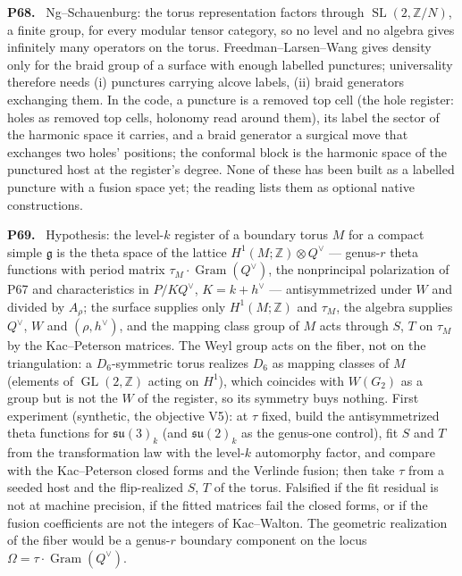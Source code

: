 \documentclass[11pt]{article}
\newcommand{\Z}{\mathbb{Z}}
\newcommand{\GL}{\operatorname{GL}}
\newcommand{\SL}{\operatorname{SL}}
\newenvironment{solution}[1]{\medskip\noindent\textbf{P#1.}\ }{\par\medskip}
\begin{document}
\begin{solution}{68}
Ng--Schauenburg: the torus representation factors through $\SL(2,\Z/N)$, a
finite group, for every modular tensor category, so no level and no algebra
gives infinitely many operators on the torus. Freedman--Larsen--Wang gives
density only for the braid group of a surface with enough labelled
punctures; universality therefore needs (i) punctures carrying alcove labels,
(ii) braid generators exchanging them. In the code, a puncture is a removed
top cell (the hole register: holes as removed top cells, holonomy read around
them), its label the sector of the harmonic space it carries, and a braid
generator a surgical move that exchanges two holes' positions; the
conformal block is the harmonic space of the punctured host at the register's
degree. None of these has been built as a labelled puncture with a fusion
space yet; the reading lists them as optional native constructions.
\end{solution}

\begin{solution}{69}
Hypothesis: the level-$k$ register of a boundary torus $M$ for a compact
simple $\mathfrak g$ is the theta space of the lattice $H^1(M;\Z)\otimes Q^\vee$
--- genus-$r$ theta functions with period matrix $\tau_M\cdot\operatorname{Gram}(Q^\vee)$,
the nonprincipal polarization of P67 and characteristics in
$P/KQ^\vee$, $K = k+h^\vee$ --- antisymmetrized
under $W$ and divided by $A_\rho$; the surface supplies only $H^1(M;\Z)$
and $\tau_M$, the algebra supplies $Q^\vee$, $W$ and $(\rho,h^\vee)$, and the
mapping class group of $M$ acts through $S$, $T$ on $\tau_M$ by the
Kac--Peterson matrices. The Weyl group acts on the fiber, not on the
triangulation: a $D_6$-symmetric torus realizes $D_6$ as mapping classes
of $M$ (elements of $\GL(2,\Z)$ acting on $H^1$), which coincides with
$W(G_2)$ as a group but is not the $W$ of the register, so its symmetry
buys nothing. First experiment (synthetic, the objective V5): at $\tau$ fixed,
build the antisymmetrized theta functions for $\mathfrak{su}(3)_k$ (and
$\mathfrak{su}(2)_k$ as the genus-one control), fit $S$ and $T$ from the
transformation law with the level-$k$ automorphy factor, and compare with
the Kac--Peterson closed forms and the Verlinde fusion; then take $\tau$ from
a seeded host and the flip-realized $S$, $T$ of the torus. Falsified if the
fit residual is not at machine precision, if the fitted matrices fail the
closed forms, or if the fusion coefficients are not the integers of
Kac--Walton. The geometric realization of the fiber would be a genus-$r$
boundary component on the locus $\Omega = \tau\cdot\operatorname{Gram}(Q^\vee)$.
\end{solution}
\end{document}
